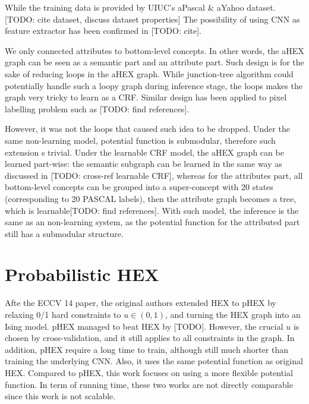 \documentclass[11pt,a4paper]{article}
\begin{document}
While the training data is provided by UIUC's aPascal \& aYahoo dataset. [TODO: cite dataset, discuss dataset properties] The possibility of using CNN as feature extractor has been confirmed in [TODO: cite].

We only connected attributes to bottom-level concepts. In other words, the aHEX graph can be seen as a semantic part and an attribute part. Such design is for the sake of reducing loops in the aHEX graph. While junction-tree algorithm could potentially handle such a loopy graph during inference stage, the loops makes the graph very tricky to learn as a CRF. Similar design has been applied to pixel labelling problem such as [TODO: find references].

However, it was not the loops that caused such idea to be dropped. Under the same non-learning model, potential function is submodular, therefore such extension s trivial. Under the learnable CRF model, the aHEX graph can be learned part-wise: the semantic subgraph can be learned in the same way as discussed in [TODO: cross-ref learnable CRF], whereas for the attributes part, all bottom-level concepts can be grouped into a super-concept with 20 states (corresponding to 20 PASCAL labels), then the attribute graph becomes a tree, which is learnable[TODO: find references]. With such model, the inference is the same as an non-learning system, as the potential function for the attributed part still has a submodular structure.

\section{Probabilistic HEX}

Afte the ECCV 14 paper, the original authors extended HEX to pHEX by relaxing 0/1 hard constraints to $u\in(0,1)$, and turning the HEX graph into an Ising model. pHEX managed to beat HEX by [TODO]. However, the crucial $u$ is chosen by cross-validation, and it still applies to all constraints in the graph. In addition, pHEX require a long time to train, although still much shorter than training the underlying CNN. Also, it uses the same potential function as original HEX. Compared to pHEX, this work focuses on using a more flexible potential function. In term of running time, these two works are not directly comparable since this work is not scalable.

\clearpage


\end{document}
